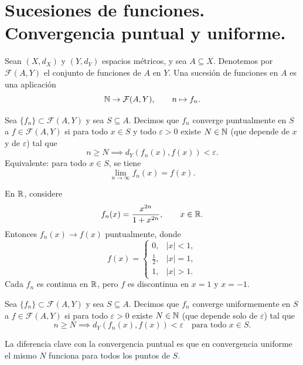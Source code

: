 \section{Sucesiones de funciones. Convergencia puntual y uniforme.}

\begin{definicion}
Sean $(X,d_X)$ y $(Y,d_Y)$ espacios métricos, y sea $A\subseteq X$.
Denotemos por $\mathcal{F}(A,Y)$ el conjunto de funciones de $A$ en $Y$.
Una sucesión de funciones en $A$ es una aplicación
\[
\mathbb{N}\to \mathcal{F}(A,Y),\qquad n\mapsto f_n.
\]
\end{definicion}

\begin{definicion}
Sea $\{f_n\}\subset \mathcal{F}(A,Y)$ y sea $S\subseteq A$.
Decimos que $f_n$ converge puntualmente en $S$ a $f\in \mathcal{F}(A,Y)$ si para todo $x\in S$ y todo $\varepsilon>0$ existe $N\in\mathbb{N}$ (que depende de $x$ y de $\varepsilon$) tal que
\[
n\ge N \implies d_Y(f_n(x),f(x))<\varepsilon.
\]
Equivalente: para todo $x\in S$, se tiene
\[
\lim_{n\to\infty}f_n(x)=f(x).
\]
\end{definicion}

\begin{example}
En $\mathbb{R}$, considere
\[
f_n(x)=\frac{x^{2n}}{1+x^{2n}},\qquad x\in\mathbb{R}.
\]
Entonces $f_n(x)\to f(x)$ puntualmente, donde
\[
f(x)=\begin{cases}
0, & |x|<1,\\
\frac12, & |x|=1,\\
1, & |x|>1.
\end{cases}
\]
Cada $f_n$ es continua en $\mathbb{R}$, pero $f$ es discontinua en $x=1$ y $x=-1$.
\end{example}

\begin{definicion}
Sea $\{f_n\}\subset \mathcal{F}(A,Y)$ y sea $S\subseteq A$.
Decimos que $f_n$ converge uniformemente en $S$ a $f\in \mathcal{F}(A,Y)$ si para todo $\varepsilon>0$ existe $N\in\mathbb{N}$ (que depende solo de $\varepsilon$) tal que
\[
n\ge N \implies d_Y(f_n(x),f(x))<\varepsilon\quad \text{para todo }x\in S.
\]
\end{definicion}

\begin{remark}
La diferencia clave con la convergencia puntual es que en convergencia uniforme el mismo $N$ funciona para todos los puntos de $S$.
\end{remark}

